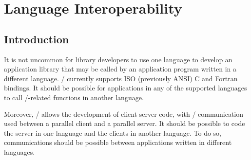 


\section{Language Interoperability}
\label{sec:misc-lang-interop}

\subsection{Introduction}

It is not uncommon for library developers to use one language to
develop an application library that may be called by an application program
written in a different language.  \MPI/ currently supports ISO
(previously ANSI) C and Fortran bindings.  It should
be possible for applications in any of the supported languages to call
\MPI/-related functions in another language.


Moreover, \MPI/ allows the development of client-server code, with \MPI/
communication used between a parallel client and a parallel server.
It should be possible to code the server in
one language and the clients in another language.
To do so, communications should be possible between applications
written in different languages.


